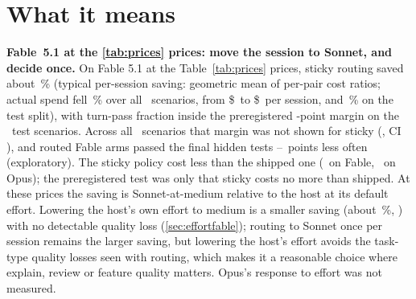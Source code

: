 \section{What it means}\label{sec:recs}

\begin{keyidea}
\textbf{Fable~5.1 at the \cref{tab:prices} prices: move the session to Sonnet, and decide once.} On Fable 5.1
at the Table~\ref{tab:prices} prices, sticky routing saved about \CfFableStickySaving\,\% (typical per-session saving: geometric mean of
per-pair cost ratios; actual spend fell \RvSpendCutAll\,\% over all \NScenarios\ scenarios, from \$\RvSpendAnchor\ to
\$\RvSpendSticky\ per session, and \RvSpendCutTest\,\% on the test split), with turn-pass
fraction inside the preregistered \NIMarginPts-point margin on the \NTest\ test scenarios. Across all
\QAllScen\ scenarios that margin was not shown for sticky (\QAllFableSticky, CI \QAllFableStickyCI), and
routed Fable arms passed the final hidden tests \FinalGapLow--\FinalGapHigh\ points less often
(exploratory). The sticky policy cost less than the shipped one (\HThreeFable\X\ on Fable, \HThreeOpus\X\ on
Opus); the preregistered test was only that sticky costs no more than shipped. At these prices the saving is
Sonnet-at-medium relative to the host at its default effort. Lowering the host's own effort to medium is a smaller
saving (about \EfCutPct\,\%, \EfRatio\X) with no detectable quality loss (\cref{sec:effortfable}); routing to Sonnet
once per session remains the larger saving, but lowering the host's effort avoids the task-type quality losses seen
with routing, which makes it a reasonable choice where explain, review or feature quality matters. Opus's response to
effort was not measured.
\end{keyidea}

